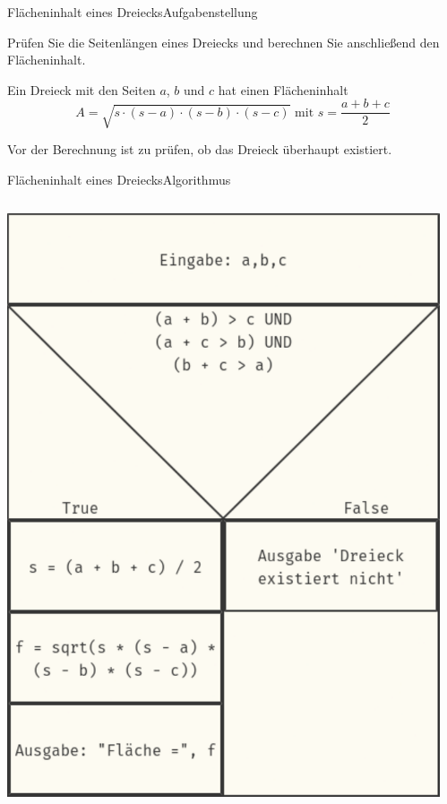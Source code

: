 \documentclass[xelatex,aspectratio=169]{beamer}
\begin{document}
\begin{frame}{Flächeninhalt eines Dreiecks}{Aufgabenstellung}

  Prüfen Sie die Seitenlängen eines Dreiecks und berechnen Sie anschließend den Flächeninhalt.

  Ein Dreieck mit den Seiten $a$, $b$ und $c$ hat einen Flächeninhalt
  \[
    A = \sqrt{s \cdot (s - a) \cdot (s - b) \cdot (s - c)} \mbox{ mit } s = \frac{a + b + c}{2}
  \]

  Vor der Berechnung ist zu prüfen, ob das Dreieck überhaupt existiert.
\end{frame}

\begin{frame}{Flächeninhalt eines Dreiecks}{Algorithmus}
  \begin{columns}
    \begin{column}{.32\textwidth}
      \includegraphics[height=.8\textheight]{fig/algorithmus_dreiecksflaeche.pdf}
    \end{column}
    \begin{column}{.68\textwidth}
      \small
    \end{column}
  \end{columns}
\end{frame}
\end{document}
